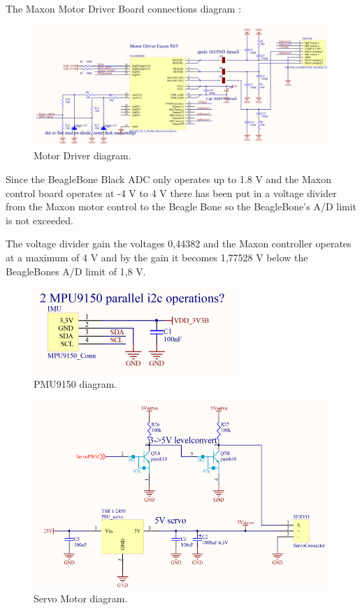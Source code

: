 The Maxon Motor Driver Board connections diagram :\\

\begin{figure}[H]
	\centering
	\includegraphics[scale=0.92]{figures/MotorDriver.pdf}
	\caption{Motor Driver diagram.}
	\label{labMotorDriver}
\end{figure}\vspace{-5mm}

Since the BeagleBone Black ADC only operates up to 1.8 V and the Maxon control board operates at -4 V to 4 V there has been put in a voltage divider from the Maxon motor control to the Beagle Bone so the BeagleBone’s A/D limit is not exceeded.

The voltage divider gain the voltages 0,44382 and the Maxon controller operates at a maximum of 4 V and by the gain it becomes 1,77528 V below the BeagleBones A/D limit of 1,8 V.



\begin{figure}[H]
	\centering
	\includegraphics[scale=0.92]{figures/PMU9150.pdf}
	\caption{PMU9150 diagram.}
	\label{labPMU9150}
\end{figure}\vspace{-5mm}


\begin{figure}[H]
	\centering
	\includegraphics[scale=0.92]{figures/ServoMotor.pdf}
	\caption{Servo Motor diagram.}
	\label{labServoMotor}
\end{figure}\vspace{-5mm}


